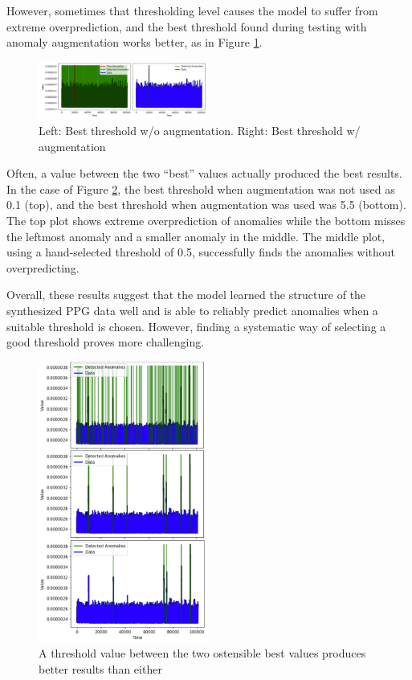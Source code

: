 \documentclass[conference]{IEEEtran}
\begin{document}
However, sometimes that thresholding level causes the model to suffer from extreme overprediction, and the best threshold found during testing with anomaly augmentation works better, as in Figure \ref{ck_fig_3}.

\begin{figure}[htbp]
    \centering
    \includegraphics[width=0.5\textwidth]{ck_fig_3.png}
    \caption{Left: Best threshold w/o augmentation. Right: Best threshold w/ augmentation}
    \label{ck_fig_3}
\end{figure}

Often, a value between the two “best” values actually produced the best results. In the case of Figure \ref{ck_fig_4}, the best threshold when augmentation was not used as 0.1 (top), and the best threshold when augmentation was used was 5.5 (bottom). The top plot shows extreme overprediction of anomalies while the bottom misses the leftmost anomaly and a smaller anomaly in the middle. The middle plot, using a hand-selected threshold of 0.5, successfully finds the anomalies without overpredicting.

Overall, these results suggest that the model learned the structure of the synthesized PPG data well and is able to reliably predict anomalies when a suitable threshold is chosen. However, finding a systematic way of selecting a good threshold proves more challenging.

\begin{figure}[htbp]
    \centering
    \includegraphics[width=0.5\textwidth]{ck_fig_4.png}
    \caption{A threshold value between the two ostensible best values produces better results than either}
    \label{ck_fig_4}
\end{figure}
\end{document}
